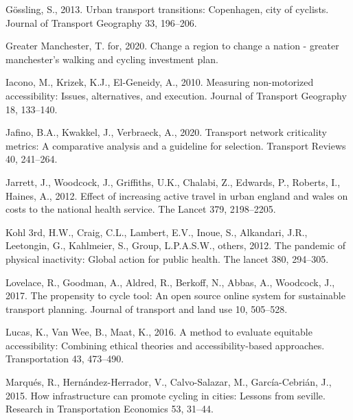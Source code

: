\documentclass[
]{article}
\newlength{\cslhangindent}
\newlength{\cslentryspacingunit} %
\newenvironment{CSLReferences}[2] %
 {%
  \setlength{\parindent}{0pt}
  \ifodd #1
  \let\oldpar\par
  \def\par{\hangindent=\cslhangindent\oldpar}
  \fi
  \setlength{\parskip}{#2\cslentryspacingunit}
 }%
 {}
\begin{document}
\begin{CSLReferences}{1}{0}
\leavevmode{}%
Gössling, S., 2013. Urban transport transitions: Copenhagen, city of cyclists. Journal of Transport Geography 33, 196--206.

\leavevmode{}%
Greater Manchester, T. for, 2020. Change a region to change a nation - greater manchester's walking and cycling investment plan.

\leavevmode{}%
Iacono, M., Krizek, K.J., El-Geneidy, A., 2010. Measuring non-motorized accessibility: Issues, alternatives, and execution. Journal of Transport Geography 18, 133--140.

\leavevmode{}%
Jafino, B.A., Kwakkel, J., Verbraeck, A., 2020. Transport network criticality metrics: A comparative analysis and a guideline for selection. Transport Reviews 40, 241--264.

\leavevmode{}%
Jarrett, J., Woodcock, J., Griffiths, U.K., Chalabi, Z., Edwards, P., Roberts, I., Haines, A., 2012. Effect of increasing active travel in urban england and wales on costs to the national health service. The Lancet 379, 2198--2205.

\leavevmode{}%
Kohl 3rd, H.W., Craig, C.L., Lambert, E.V., Inoue, S., Alkandari, J.R., Leetongin, G., Kahlmeier, S., Group, L.P.A.S.W., others, 2012. The pandemic of physical inactivity: Global action for public health. The lancet 380, 294--305.

\leavevmode{}%
Lovelace, R., Goodman, A., Aldred, R., Berkoff, N., Abbas, A., Woodcock, J., 2017. The propensity to cycle tool: An open source online system for sustainable transport planning. Journal of transport and land use 10, 505--528.

\leavevmode{}%
Lucas, K., Van Wee, B., Maat, K., 2016. A method to evaluate equitable accessibility: Combining ethical theories and accessibility-based approaches. Transportation 43, 473--490.

\leavevmode{}%
Marqués, R., Hernández-Herrador, V., Calvo-Salazar, M., García-Cebrián, J., 2015. How infrastructure can promote cycling in cities: Lessons from seville. Research in Transportation Economics 53, 31--44.


\end{CSLReferences}
\end{document}
